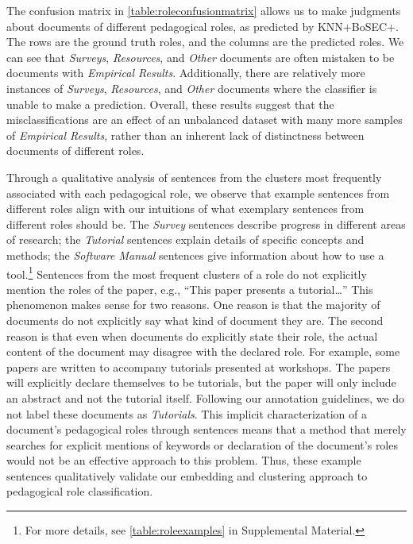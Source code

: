\documentclass[11pt,a4paper]{article}
\begin{document}
The confusion matrix in \autoref{table:roleconfusionmatrix} allows us to make judgments about documents of different pedagogical roles, as predicted by KNN+BoSEC+. The rows are the ground truth roles, and the columns are the predicted roles. We can see that \textit{Surveys}, \textit{Resources}, and \textit{Other} documents are often mistaken to be documents with \textit{Empirical Results}. Additionally, there are relatively more instances of \textit{Surveys}, \textit{Resources}, and \textit{Other} documents where the classifier is unable to make a prediction. Overall, these results suggest that the misclassifications are an effect of an unbalanced dataset with many more samples of \textit{Empirical Results}, rather than an inherent lack of distinctness between documents of different roles.

Through a qualitative analysis of sentences from the clusters most frequently associated with each pedagogical role, we observe that example sentences from different roles align with our intuitions of what exemplary sentences from different roles should be. The \textit{Survey} sentences describe progress in different areas of research; the \textit{Tutorial} sentences explain details of specific concepts and methods; the \textit{Software Manual} sentences give information about how to use a tool.\footnote{For more details, see \autoref{table:roleexamples} in Supplemental Material.} Sentences from the most frequent clusters of a role do not explicitly mention the roles of the paper, e.g., ``This paper presents a tutorial\ldots'' This phenomenon makes sense for two reasons. One reason is that the majority of documents do not explicitly say what kind of document they are. The second reason is that even when documents do explicitly state their role, the actual content of the document may disagree with the declared role. For example, some papers are written to accompany tutorials presented at workshops. The papers will explicitly declare themselves to be tutorials, but the paper will only include an abstract and not the tutorial itself. Following our annotation guidelines, we do not label these documents as \textit{Tutorials}. This implicit characterization of a document's pedagogical roles through sentences means that a method that merely searches for explicit mentions of keywords or declaration of the document's roles would not be an effective approach to this problem. Thus, these example sentences qualitatively validate our embedding and clustering approach to pedagogical role classification.
\end{document}

